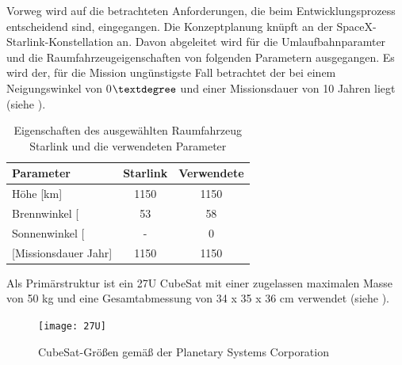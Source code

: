 	Vorweg wird auf die betrachteten Anforderungen, die beim Entwicklungsprozess entscheidend  sind, eingegangen. Die Konzeptplanung knüpft an der SpaceX-Starlink-Konstellation an. Davon abgeleitet wird für die Umlaufbahnparamter und die Raumfahrzeugeigenschaften von folgenden Parametern ausgegangen. Es wird der, für die Mission ungünstigste Fall betrachtet der bei einem Neigungswinkel von 0$\textdegree$ und einer Missionsdauer von 10 Jahren liegt (siehe ).
\begin{table}[!h]
\centering
	\begin{tabular}{|l|c|c|}
\hline
\multicolumn{1}{|l|}{Parameter}          & \multicolumn{1}{l|}{Starlink} & \multicolumn{1}{l|}{Verwendete} \\ \hline
\multicolumn{1}{|l|}{Höhe {[}km{]}}      & \multicolumn{1}{c|}{1150}     & \multicolumn{1}{c|}{1150}       \\ \hline
\multicolumn{1}{|l|}{Brennwinkel {[}\textdegree{]}} & \multicolumn{1}{c|}{53}       & \multicolumn{1}{c|}{58}       \\ \hline
\multicolumn{1}{|l|}{Sonnenwinkel {[}\textdegree{]}}       & \multicolumn{1}{c|}{-}        & \multicolumn{1}{c|}{0}          \\ \hline
\multicolumn{1}{|l|}{ {[}Missionsdauer {Jahr]}}      & \multicolumn{1}{c|}{1150}     & \multicolumn{1}{c|}{1150}       \\ \hline
          
	\end{tabular}
	\caption{Eigenschaften des ausgewählten Raumfahrzeug Starlink und die verwendeten Parameter \cite{Lettau.}}
	\label{tab:parameter}
\end{table}

	
	Als Primärstruktur ist ein 27U CubeSat mit einer zugelassen maximalen Masse von 50 kg und eine Gesamtabmessung von 34 x 35 x 36 cm verwendet (siehe ). 				
				\begin{figure}[!h]
					\centering
						\texttt{[image: 27U]}
					\caption{CubeSat-Größen gemäß der Planetary Systems Corporation \cite{Lettau.}}
					\label{fig:27U}
				\end{figure}

